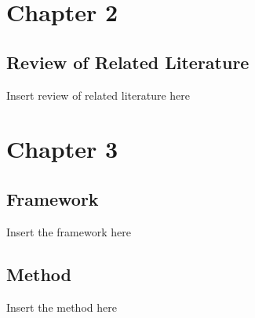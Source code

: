 \documentclass[letterpaper,10pt,titlepage]{article}
\begin{document}
\section*{Chapter 2}
\subsection*{Review of Related Literature}
Insert review of related literature here


\section*{Chapter 3}


\subsection*{Framework}
Insert the framework here


\subsection*{Method}
Insert the method here
\end{document}
